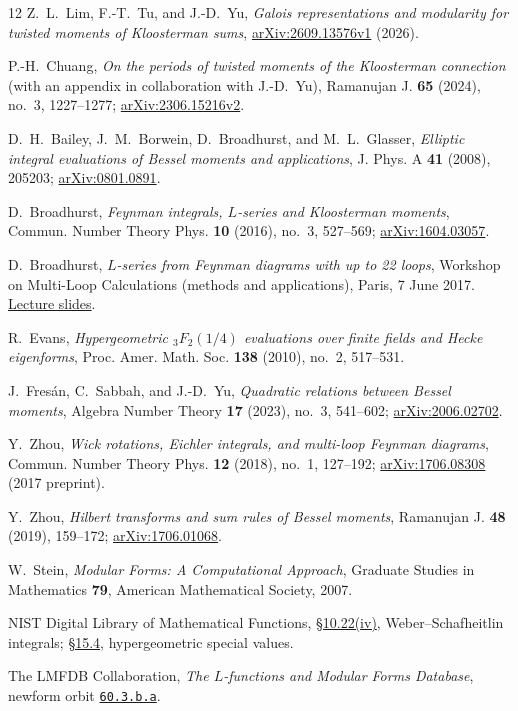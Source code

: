 \documentclass[11pt]{article}
\numberwithin{equation}{section}
\theoremstyle{definition}
\theoremstyle{remark}
\theoremstyle{plain}
\begin{document}
\begin{thebibliography}{12}
Z.~L.~Lim, F.-T.~Tu, and J.-D.~Yu,
\emph{Galois representations and modularity for twisted moments of Kloosterman sums},
\href{https://arxiv.org/abs/2609.13576v1}{arXiv:2609.13576v1} (2026).

P.-H.~Chuang,
\emph{On the periods of twisted moments of the Kloosterman connection}
(with an appendix in collaboration with J.-D.~Yu),
Ramanujan J. \textbf{65} (2024), no.~3, 1227--1277;
\href{https://arxiv.org/abs/2306.15216v2}{arXiv:2306.15216v2}.

D.~H.~Bailey, J.~M.~Borwein, D.~Broadhurst, and M.~L.~Glasser,
\emph{Elliptic integral evaluations of Bessel moments and applications},
J. Phys. A \textbf{41} (2008), 205203;
\href{https://arxiv.org/abs/0801.0891}{arXiv:0801.0891}.

D.~Broadhurst,
\emph{Feynman integrals, $L$-series and Kloosterman moments},
Commun. Number Theory Phys. \textbf{10} (2016), no.~3, 527--569;
\href{https://arxiv.org/abs/1604.03057}{arXiv:1604.03057}.

D.~Broadhurst,
\emph{$L$-series from Feynman diagrams with up to 22 loops},
Workshop on Multi-Loop Calculations (methods and applications),
Paris, 7 June 2017.
\href{https://multi-loop-2017.sciencesconf.org/data/program/Broadhurst.pdf}{Lecture slides}.

R.~Evans,
\emph{Hypergeometric ${}_3F_2(1/4)$ evaluations over finite fields and Hecke eigenforms},
Proc. Amer. Math. Soc. \textbf{138} (2010), no.~2, 517--531.

J.~Fres\'an, C.~Sabbah, and J.-D.~Yu,
\emph{Quadratic relations between Bessel moments},
Algebra Number Theory \textbf{17} (2023), no.~3, 541--602;
\href{https://arxiv.org/abs/2006.02702}{arXiv:2006.02702}.

Y.~Zhou,
\emph{Wick rotations, Eichler integrals, and multi-loop Feynman diagrams},
Commun. Number Theory Phys. \textbf{12} (2018), no.~1, 127--192;
\href{https://arxiv.org/abs/1706.08308}{arXiv:1706.08308} (2017 preprint).

Y.~Zhou,
\emph{Hilbert transforms and sum rules of Bessel moments},
Ramanujan J. \textbf{48} (2019), 159--172;
\href{https://arxiv.org/abs/1706.01068}{arXiv:1706.01068}.

W.~Stein,
\emph{Modular Forms: A Computational Approach},
Graduate Studies in Mathematics \textbf{79}, American Mathematical Society, 2007.

NIST Digital Library of Mathematical Functions,
\href{https://dlmf.nist.gov/10.22}{\S10.22(iv)}, Weber--Schafheitlin integrals;
\href{https://dlmf.nist.gov/15.4}{\S15.4}, hypergeometric special values.

The LMFDB Collaboration,
\emph{The $L$-functions and Modular Forms Database},
newform orbit \href{https://www.lmfdb.org/ModularForm/GL2/Q/holomorphic/60/3/b/a/}{\texttt{60.3.b.a}}.
\end{thebibliography}
\end{document}
